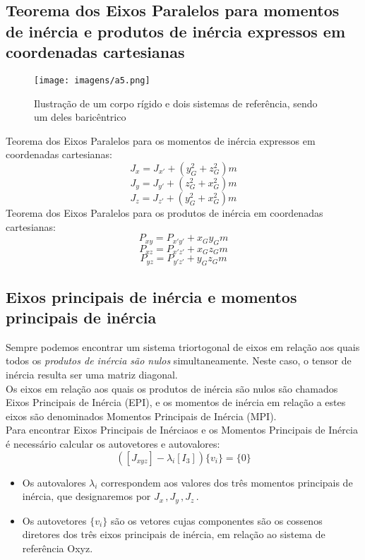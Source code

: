 \documentclass[a4paper, 12pt]{article}
\begin{document}
	\subsection{Teorema dos Eixos Paralelos para momentos de inércia e produtos de inércia expressos em coordenadas cartesianas}
		\begin{figure}[h]
			\center
			\texttt{[image: imagens/a5.png]} 
			\caption{Ilustração de um corpo rígido e dois sistemas de referência, sendo um deles baricêntrico}
		\end{figure}	
		Teorema dos Eixos Paralelos para os momentos de inércia expressos em coordenadas cartesianas:
		\begin{equation}
			J_x = J_{x'} + (y_G^2 + z_G^2)m
		\end{equation}
		\begin{equation}
			J_y = J_{y'} + (z_G^2 + x_G^2)m
		\end{equation}
		\begin{equation}
			J_z = J_{z'} + (y_G^2 + x_G^2)m
		\end{equation}
		Teorema dos Eixos Paralelos para os produtos de inércia em coordenadas cartesianas:
		\begin{equation}
			P_{xy} = P_{x'y'} + x_Gy_Gm
		\end{equation}
		\begin{equation}
			P_{xz} = P_{x'z'} + x_Gz_Gm
		\end{equation}
		\begin{equation}
			P_{yz} = P_{y'z'} + y_Gz_Gm
		\end{equation}

	\subsection{Eixos principais de inércia e momentos principais de inércia}
		Sempre podemos encontrar um sistema triortogonal de eixos em relação aos quais todos os \textit{produtos de inércia são nulos} simultaneamente. Neste caso, o tensor de inércia resulta ser uma matriz diagonal.\\
		
		Os eixos em relação aos quais os produtos de inércia são nulos são chamados Eixos Principais de Inércia (EPI), e os momentos de inércia em relação a estes eixos são denominados Momentos Principais de Inércia (MPI).\\
		
		Para encontrar Eixos Principais de Inérciaos e os Momentos Principais de Inércia é necessário calcular os autovetores e autovalores:
		\begin{equation}
			([J_{xyz}] - \lambda_i[I_3])\{v_i\} = \{0\}
		\end{equation}
		\begin{itemize}
			\item Os autovalores $\lambda_i$ correspondem aos valores dos três momentos principais de inércia, que designaremos por $J_{x~} , J_{y~} , J_{z~}$.
			\item Os autovetores $\{v_i\}$ são os vetores cujas componentes são os cossenos diretores dos três eixos principais de inércia, em relação ao sistema de referência Oxyz.
		\end{itemize}
\end{document}
